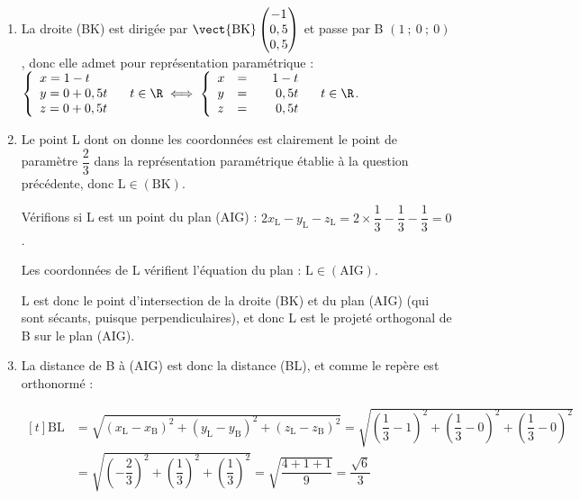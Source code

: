 \begin{enumerate}
$\begin{aligned}[t]  2x_\mathrm{A} - y_\mathrm{A} - z_\mathrm{A} + d=0 &\iff 2\times 0 - 0 - 0 + d = 0\\&\iff d =0\end{aligned}$

Finalement, une équation du plan (AIG) est donc bien $2x-y-z = 0$.

\item La droite (BK) est dirigée par $ \vect{\mathrm{BK}} \begin{pmatrix} -1\\0,5\\0,5 \end{pmatrix}$ et passe par B $ (1~;~0~;~0)$, donc elle admet pour représentation paramétrique :
\quad
$ \left\{\begin{array}{l} x = 1 - t\\y = 0 + 0,5t\\z = 0 + 0,5t  \end{array}\right. \quad t \in \R \iff \left\{\begin{array}{l c r} x &=& 1 - t\\y &=&\phantom{1 -}0,5t\\z &=&\phantom{1 -}0,5t \end{array}\right. \quad t \in \R$.

\item Le point L dont on donne les coordonnées est clairement le point de paramètre $ \dfrac{2}{3} $ dans la représentation paramétrique établie à la question précédente, donc $\mathrm{L} \in (\mathrm{BK})$.

Vérifions si L est un point du plan (AIG) : $2x_\mathrm{L} - y_\mathrm{L} -z_\mathrm{L} = 2\times \dfrac{1}{3} - \dfrac{1}{3} - \dfrac{1}{3} = 0$.

Les coordonnées de L vérifient l'équation du plan : $\mathrm{L} \in (\mathrm{AIG})$.

L est donc le point d'intersection de la droite (BK) et du plan (AIG) (qui sont sécants, puisque perpendiculaires), et donc L est le projeté orthogonal de B sur le plan (AIG).

\item La distance de B à (AIG) est donc la distance (BL), et comme le repère est orthonormé :

$\begin{aligned}[t] \mathrm{BL} &= \sqrt{\left(x_\mathrm{L} - x_\mathrm{B}\right)^2+\left(y_\mathrm{L} - y_\mathrm{B}\right)^2+\left(z_\mathrm{L} - z_\mathrm{B}\right)^2 }
			 = \sqrt{\left(\dfrac{1}{3}-1\right)^2+\left(\dfrac{1}{3}-0\right)^2+\left(\dfrac{1}{3}-0\right)^2 }\\
			 &=  \sqrt{\left(-\dfrac{2}{3}\right)^2+\left(\dfrac{1}{3}\right)^2+\left(\dfrac{1}{3}\right)^2 } = \sqrt{\dfrac{4 + 1 + 1}{9}} = \dfrac{\sqrt{6}}{3}\end{aligned}$
		\end{enumerate}

